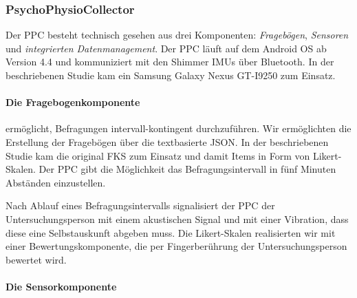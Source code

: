 \subsubsection{PsychoPhysioCollector} 

\label{ssub:psychophysiocollector}

Der \ac{PPC} besteht technisch gesehen aus drei Komponenten: \emph{Fragebögen}, \emph{Sensoren} und \emph{integrierten Datenmanagement}. Der \ac{PPC} läuft auf dem Android OS ab Version 4.4 und kommuniziert mit den Shimmer \acp{IMU} über Bluetooth. In der beschriebenen Studie kam ein Samsung Galaxy Nexus GT-I9250 zum Einsatz.

\paragraph{Die Fragebogenkomponente} 

\label{par:die_fragebogenkomponente}

ermöglicht, Befragungen intervall-kontingent durchzuführen. Wir ermöglichten die Erstellung der Fragebögen über die textbasierte JSON. In der beschriebenen Studie kam die original \ac{FKS} zum Einsatz und damit Items in Form von Likert-Skalen. Der \ac{PPC} gibt die Möglichkeit das Befragungsintervall in fünf Minuten Abständen einzustellen.

Nach Ablauf eines Befragungsintervalls signalisiert der \ac{PPC} der Untersuchungsperson mit einem akustischen Signal und mit einer Vibration, dass diese eine Selbstauskunft abgeben muss. Die Likert-Skalen realisierten wir mit einer Bewertungskomponente, die per Fingerberührung der Untersuchungsperson bewertet wird.

\paragraph{Die Sensorkomponente} 

\label{par:die_sensorkomponente}


